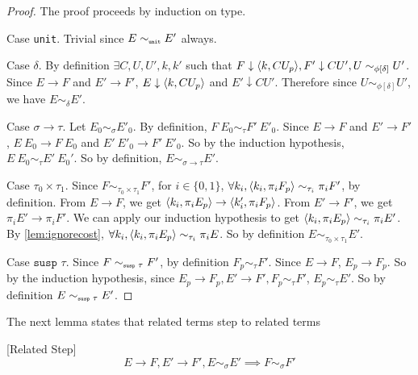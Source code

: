 \begin{proof}
  The proof proceeds by induction on type.

  Case \texttt{unit}. Trivial since $E \sim_{\texttt{\tiny{unit}}} E'$ always.

  Case $\delta$.
  By definition $\exists C, U, U', k, k'$ such that $F \downarrow \langle k, C U_p \rangle, F' \downarrow C U', U \sim_{\phi[\delta]} U'$.
  Since $E \to F$ and $E' \to F'$, $E \downarrow \langle k, C U_p \rangle$ and $E' \downarrow C U'$.
  Therefore since $U \sim_{\phi[\delta]} U'$, we have $E \sim_\delta E'$.

  Case $\sigma \to \tau$.
  Let $E_0 \sim_\sigma E'_0$.
  By definition, $F\ E_0 \sim_\tau F'\ E'_0$.
  Since $E \to F$ and $E' \to F'$, $E\ E_0 \to F\ E_0$ and $E'\ E'_0 \to F'\ E'_0$.
  So by the induction hypothesis, $E\ E_0 \sim_\tau E'\ E_0'$.
  So by definition, $E \sim_{\sigma \to \tau} E'$.

  Case $\tau_0 \times \tau_1$.
  Since $F \sim_{\tau_0 \times \tau_1} F'$, for $i\in\{0, 1\}$,  $\forall k_i, \langle k_i, \pi_i F_p \rangle \sim_{\tau_i} \pi_i F'$, by definition.
  From $E \to F$, we get $\langle k_i, \pi_i E_p \rangle \to \langle k_i', \pi_i F_p \rangle$.
  From $E' \to F'$, we get $\pi_i E' \to \pi_i F'$.
  We can apply our induction hypothesis to get $\langle k_i, \pi_i E_p \rangle \sim_{\tau_i} \pi_i E'$.
  By \ref{lem:ignorecost}, $\forall k_i, \langle k_i, \pi_i E_p \rangle \sim_{\tau_i} \pi_i E$.
  So by definition $E \sim_{\tau_0 \times \tau_1} E'$.

  Case $\texttt{susp }\tau$.
  Since $F \sim_{\texttt{\tiny{susp }}\tau} F'$, by definition $F_p \sim_\tau F'$.
  Since $E \to F$, $E_p \to F_p$.
  So by the induction hypothesis, since $E_p \to F_p, E' \to F', F_p \sim_\tau F'$, $E_p \sim_\tau E'$.
  So by definition $E \sim_{\texttt{\tiny{susp }}\tau} E'$.

\end{proof}
%
The next lemma states that related terms step to related terms
%
\begin{lemma}
  \label{lem:relatedstep}[Related Step]
  \[ E \to F, E' \to F', E \sim_\sigma E' \implies F \sim_\sigma F' \]
\end{lemma}
%

